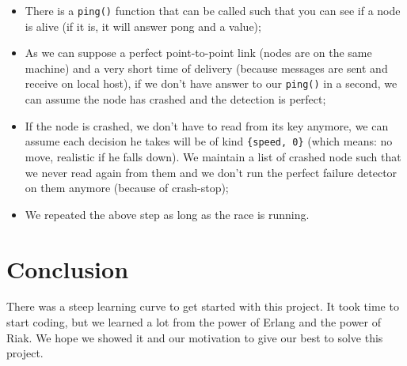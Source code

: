 \documentclass{article}
\begin{document}
\begin{itemize}
    \item There is a \verb#ping()# function that can be called such that you can
    see if a node is alive (if it is, it will answer pong and a value);
    \item As we can suppose a perfect point-to-point link (nodes are on the
    same machine) and a very short time of delivery (because messages are sent
    and receive on local host), if we don't have answer to our \verb#ping()# in
    a second, we can assume the node has crashed and the detection is perfect;
    \item If the node is crashed, we don't have to read from its key anymore,
    we can assume each decision he takes will be of kind \verb#{speed, 0}#
    (which means: no move, realistic if he falls down). We maintain a list
    of crashed node such that we never read again from them and we don't run
    the perfect failure detector on them anymore (because of crash-stop);
    \item We repeated the above step as long as the race is running.
\end{itemize}

\section*{Conclusion}

There was a steep learning curve to get started with this project. It took time
to start coding, but we learned a lot from the power of Erlang and the power
of Riak. We hope we showed it and our motivation to give our best to solve this
project.
\end{document}
